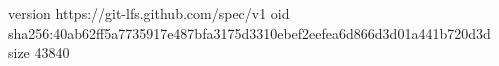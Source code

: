 version https://git-lfs.github.com/spec/v1
oid sha256:40ab62ff5a7735917e487bfa3175d3310ebef2eefea6d866d3d01a441b720d3d
size 43840

